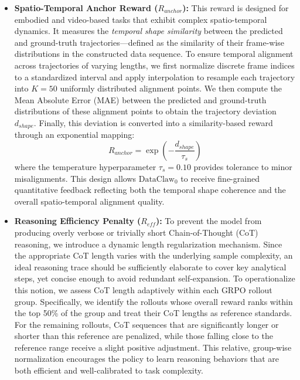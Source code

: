 \begin{itemize}[leftmargin=20pt, labelsep=4pt]
\item \textbf{Spatio-Temporal Anchor Reward (\(R_{anchor}\)):} 
This reward is designed for embodied and video-based tasks that exhibit complex spatio-temporal dynamics. 
It measures the \textit{temporal shape similarity} between the predicted and ground-truth trajectories—defined as the similarity of their frame-wise distributions in the constructed data sequence. 
To ensure temporal alignment across trajectories of varying lengths, we first normalize discrete frame indices to a standardized interval and apply interpolation to resample each trajectory into \(K = 50\) uniformly distributed alignment points. 
We then compute the Mean Absolute Error (MAE) between the predicted and ground-truth distributions of these alignment points to obtain the trajectory deviation \(d_{shape}\). 
Finally, this deviation is converted into a similarity-based reward through an exponential mapping:
\begin{equation}
R_{anchor} = \exp\left(-\frac{d_{shape}}{\tau_s}\right)
\end{equation}
where the temperature hyperparameter \(\tau_s = 0.10\) provides tolerance to minor misalignments. 
This design allows $\text{DataClaw}_0$ to receive fine-grained quantitative feedback reflecting both the temporal shape coherence and the overall spatio-temporal alignment quality.

    

\item \textbf{Reasoning Efficiency Penalty (\(R_{eff}\)):} 
To prevent the model from producing overly verbose or trivially short Chain-of-Thought (CoT) reasoning, we introduce a dynamic length regularization mechanism. 
Since the appropriate CoT length varies with the underlying sample complexity, an ideal reasoning trace should be sufficiently elaborate to cover key analytical steps, yet concise enough to avoid redundant self-expansion. 
To operationalize this notion, we assess CoT length adaptively within each GRPO rollout group. 
Specifically, we identify the rollouts whose overall reward ranks within the top 50\% of the group and treat their CoT lengths as reference standards. 
For the remaining rollouts, CoT sequences that are significantly longer or shorter than this reference are penalized, while those falling close to the reference range receive a slight positive adjustment. 
This relative, group-wise normalization encourages the policy to learn reasoning behaviors that are both efficient and well-calibrated to task complexity.
    
\end{itemize}

